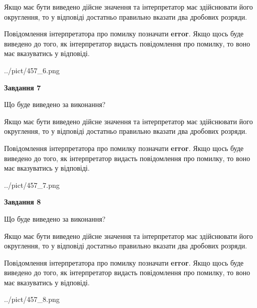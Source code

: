 \documentclass[12pt, ukrainian]{article}
\begin{document}
{\begin {Large}
Якщо має бути виведено дійсне значення та інтерпретатор має здійснювати його округлення, 
то у відповіді достатньо правильно вказати два дробових розряди.

Повідомлення інтерпретатора про помилку позначати \textbf{error}.
Якщо щось буде виведено до того, як інтерпретатор видасть повідомлення про помилку, 
то воно має вказуватись у відповіді. \par

\begin{center}
	{../pict/457_6.png}
\end{center}
\newpage

{\begin {center}\textbf{Завдання 7}\end {center}}\par
Що буде виведено за виконання? \par

Якщо має бути виведено дійсне значення та інтерпретатор має здійснювати його округлення, 
то у відповіді достатньо правильно вказати два дробових розряди.

Повідомлення інтерпретатора про помилку позначати \textbf{error}.
Якщо щось буде виведено до того, як інтерпретатор видасть повідомлення про помилку, 
то воно має вказуватись у відповіді. \par

\begin{center}
	{../pict/457_7.png}
\end{center}
\newpage

{\begin {center}\textbf{Завдання 8}\end {center}}\par
Що буде виведено за виконання? \par

Якщо має бути виведено дійсне значення та інтерпретатор має здійснювати його округлення, 
то у відповіді достатньо правильно вказати два дробових розряди.

Повідомлення інтерпретатора про помилку позначати \textbf{error}.
Якщо щось буде виведено до того, як інтерпретатор видасть повідомлення про помилку, 
то воно має вказуватись у відповіді. \par

\begin{center}
	{../pict/457_8.png}
\end{center}
\newpage


\end{Large}}
\end{document}
